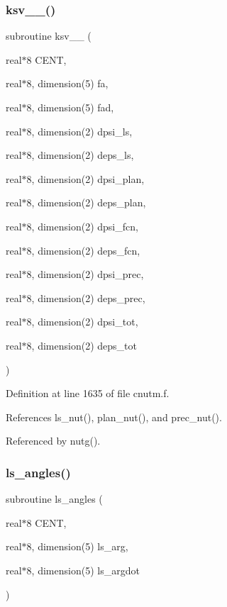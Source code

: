 \subsubsection{\texorpdfstring{ksv\+\_\+\_()}{ksv\_1996\_3()}}
{\footnotesize\ttfamily subroutine ksv\+\_\+\_ (\begin{DoxyParamCaption}\item[{real$\ast$8}]{C\+E\+NT,  }\item[{real$\ast$8, dimension(5)}]{fa,  }\item[{real$\ast$8, dimension(5)}]{fad,  }\item[{real$\ast$8, dimension(2)}]{dpsi\+\_\+ls,  }\item[{real$\ast$8, dimension(2)}]{deps\+\_\+ls,  }\item[{real$\ast$8, dimension(2)}]{dpsi\+\_\+plan,  }\item[{real$\ast$8, dimension(2)}]{deps\+\_\+plan,  }\item[{real$\ast$8, dimension(2)}]{dpsi\+\_\+fcn,  }\item[{real$\ast$8, dimension(2)}]{deps\+\_\+fcn,  }\item[{real$\ast$8, dimension(2)}]{dpsi\+\_\+prec,  }\item[{real$\ast$8, dimension(2)}]{deps\+\_\+prec,  }\item[{real$\ast$8, dimension(2)}]{dpsi\+\_\+tot,  }\item[{real$\ast$8, dimension(2)}]{deps\+\_\+tot }\end{DoxyParamCaption})}



Definition at line 1635 of file cnutm.\+f.



References ls\+\_\+nut(), plan\+\_\+nut(), and prec\+\_\+nut().



Referenced by nutg().

\mbox{\label{cnutm_8f_afed186bc98891de660532529d2b4a495}} 
\subsubsection{\texorpdfstring{ls\+\_\+angles()}{ls\_angles()}}
{\footnotesize\ttfamily subroutine ls\+\_\+angles (\begin{DoxyParamCaption}\item[{real$\ast$8}]{C\+E\+NT,  }\item[{real$\ast$8, dimension(5)}]{ls\+\_\+arg,  }\item[{real$\ast$8, dimension(5)}]{ls\+\_\+argdot }\end{DoxyParamCaption})}



